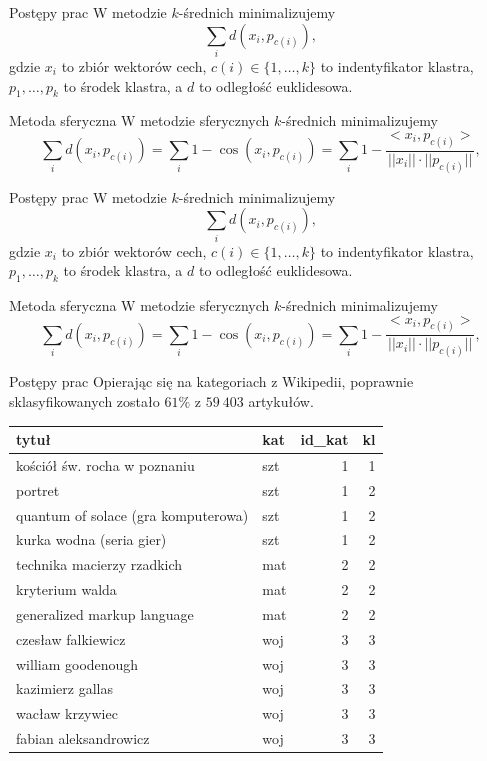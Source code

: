 \documentclass[11pt,pdftex,mathserif]{beamer}\usepackage[]{graphicx}\usepackage[]{color}
\theoremstyle{definition}
\begin{document}
\begin{frame}{Postępy prac}
W metodzie $k$-średnich minimalizujemy
$$
\sum_i d(x_i, p_{c(i)}),
$$
gdzie $x_i$ to zbiór wektorów cech, $c(i) \in \{1,\ldots,k\}$ to indentyfikator klastra, $p_1,\ldots,p_k$ to środek klastra, a $d$ to odległość euklidesowa.
\begin{block}{Metoda sferyczna}
W metodzie sferycznych $k$-średnich minimalizujemy
$$
\sum_i d(x_i, p_{c(i)}) = \sum_i 1-\cos(x_i, p_{c(i)}) = \sum_i 1-\frac{<x_i, p_{c(i)}>}{||x_i||\cdot ||p_{c(i)}||},
$$
\end{block}
\end{frame}


\begin{frame}{Postępy prac}
W metodzie $k$-średnich minimalizujemy
$$
\sum_i d(x_i, p_{c(i)}),
$$
gdzie $x_i$ to zbiór wektorów cech, $c(i) \in \{1,\ldots,k\}$ to indentyfikator klastra, $p_1,\ldots,p_k$ to środek klastra, a $d$ to odległość euklidesowa.
\begin{block}{Metoda sferyczna}
W metodzie sferycznych $k$-średnich minimalizujemy
$$
\sum_i d(x_i, p_{c(i)}) = \sum_i 1-\cos(x_i, p_{c(i)}) = \sum_i 1-\frac{<x_i, p_{c(i)}>}{||x_i||\cdot ||p_{c(i)}||},
$$
\end{block}
\end{frame}


\begin{frame}{Postępy prac}
Opierając się na kategoriach z Wikipedii, poprawnie sklasyfikowanych zostało $61\%$ z $59\ 403$ artykułów.
\begin{tabular}{|l|l|r|r|}
  \hline
tytuł & kat & id\_kat & kl \\ 
  \hline
kościół św. rocha w poznaniu & szt & 1 & 1 \\ 
  portret & szt & 1 & 2 \\ 
  quantum of solace (gra komputerowa) & szt & 1 & 2 \\ 
  kurka wodna (seria gier) & szt & 1 & 2 \\ 
  technika macierzy rzadkich & mat & 2 & 2 \\ 
  kryterium walda & mat & 2 & 2 \\ 
  generalized markup language & mat & 2 & 2 \\ 
  czesław falkiewicz & woj & 3 & 3 \\ 
  william goodenough & woj & 3 & 3 \\ 
  kazimierz gallas & woj & 3 & 3 \\ 
  wacław krzywiec & woj & 3 & 3 \\ 
  fabian aleksandrowicz & woj & 3 & 3 \\ 
   \hline
\end{tabular}

% 
% 
\end{frame}
\end{document}
